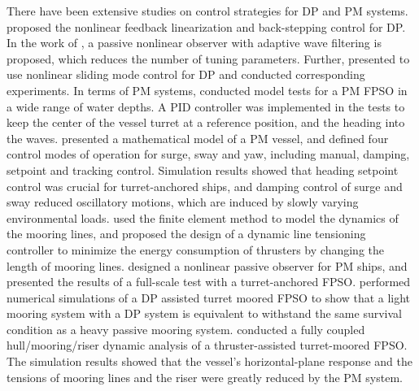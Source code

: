 \begin{sloppypar}
There have been extensive studies on control strategies for DP and PM systems.  \cite{aarset1998nonlinear} proposed the nonlinear feedback linearization and back-stepping control for DP.  In the work of \cite{fossen1999passive}, a passive nonlinear observer with adaptive wave filtering is proposed, which reduces the number of tuning parameters. Further, \cite{tannuri2010dynamic} presented to use nonlinear sliding mode control for DP and conducted corresponding experiments. In terms of PM systems, \cite{aalbers1996hydrodynamic} conducted model tests for a PM FPSO in a wide range of water depths. A PID controller was implemented in the tests to keep the center of the vessel turret at a reference position, and the heading into the waves. \cite{strand1998design} presented a mathematical model of a PM vessel, and defined four control modes of operation for surge, sway and yaw, including manual, damping, setpoint and tracking control. Simulation results showed that heading setpoint control was crucial for turret-anchored ships, and damping control of surge and sway reduced oscillatory motions, which are induced by slowly varying environmental loads. \cite{aamo1999controlling} used the finite element method to model the dynamics of the mooring lines, and proposed the design of a dynamic line tensioning controller to minimize the energy consumption of thrusters by changing the length of mooring lines. \cite{sorensen1999thruster} designed a nonlinear passive observer for PM ships, and presented the results of a full-scale test with a turret-anchored FPSO. \cite{wichers1999benefits} performed numerical simulations of a DP assisted turret moored FPSO to show that a light mooring system with a DP system is equivalent to withstand the same survival condition as a heavy passive mooring system. \cite{ryu2003coupled} conducted a fully coupled hull/mooring/riser dynamic analysis of a thruster-assisted turret-moored FPSO. The simulation results showed that the vessel's horizontal-plane response and the tensions of mooring lines and the riser were greatly reduced by the PM system. 


\end{sloppypar}
